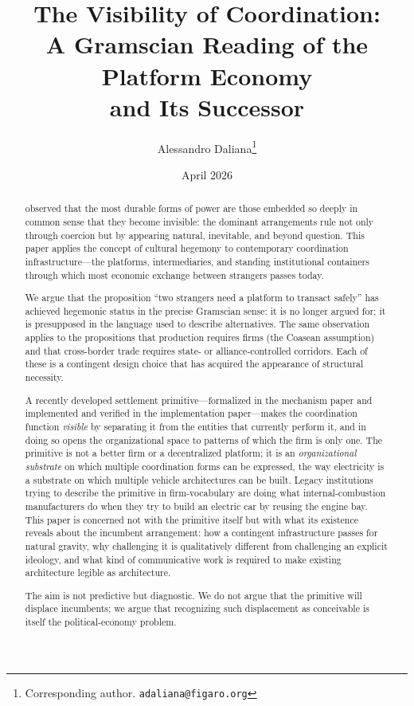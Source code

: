\documentclass[11pt,a4paper]{article}
\title{%
  The Visibility of Coordination:\\
  A Gramscian Reading of the Platform Economy\\
  and Its Successor%
}
\author{
  Alessandro Daliana\thanks{Corresponding author. \texttt{adaliana@figaro.org}}
}
\date{April 2026}
\theoremstyle{remark}
\begin{document}
\maketitle

\begin{abstract}
\citet{gramsci1971} observed that the most durable forms of power
are those embedded so deeply in common sense that they become
invisible: the dominant arrangements rule not only through coercion
but by appearing natural, inevitable, and beyond question. This
paper applies the concept of cultural hegemony to contemporary
coordination infrastructure---the platforms, intermediaries, and
standing institutional containers through which most economic
exchange between strangers passes today.

We argue that the proposition ``two strangers need a platform to
transact safely'' has achieved hegemonic status in the precise
Gramscian sense: it is no longer argued for; it is presupposed in
the language used to describe alternatives. The same observation
applies to the propositions that production requires firms (the
Coasean assumption) and that cross-border trade requires
state- or alliance-controlled corridors. Each of these is a
contingent design choice that has acquired the appearance of
structural necessity.

A recently developed settlement primitive---formalized
in the mechanism paper and implemented and verified
in the implementation paper---makes the coordination function
\emph{visible} by separating it from the entities that currently
perform it, and in doing so opens the organizational space to
patterns of which the firm is only one. The primitive is not a
better firm or a decentralized platform; it is an
\emph{organizational substrate} on which multiple coordination
forms can be expressed, the way electricity is a substrate on
which multiple vehicle architectures can be built. Legacy
institutions trying to describe the primitive in firm-vocabulary
are doing what internal-combustion manufacturers do when they try
to build an electric car by reusing the engine bay. This paper
is concerned not with the primitive itself but with what its
existence reveals about the incumbent arrangement: how a
contingent infrastructure passes for natural gravity, why
challenging it is qualitatively different from challenging an
explicit ideology, and what kind of communicative work is required
to make existing architecture legible as architecture.

The aim is not predictive but diagnostic. We do not argue that the
primitive will displace incumbents; we argue that recognizing such
displacement as conceivable is itself the political-economy
problem.
\end{abstract}
\end{document}

